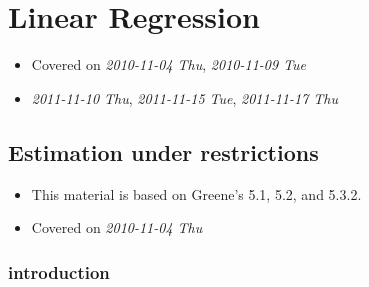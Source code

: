 
\chapter{Linear Regression}

\begin{itemize}
\item Covered on \textit{2010-11-04 Thu}, \textit{2010-11-09 Tue}
\item \textit{2011-11-10 Thu}, \textit{2011-11-15 Tue}, \textit{2011-11-17 Thu}
\end{itemize}
\section{Estimation under restrictions}
\label{sec-1}

\begin{itemize}
\item This material is based on Greene's 5.1, 5.2, and 5.3.2.
\item Covered on \textit{2010-11-04 Thu}
\end{itemize}
\subsection{introduction}
\label{sec-1-1}

